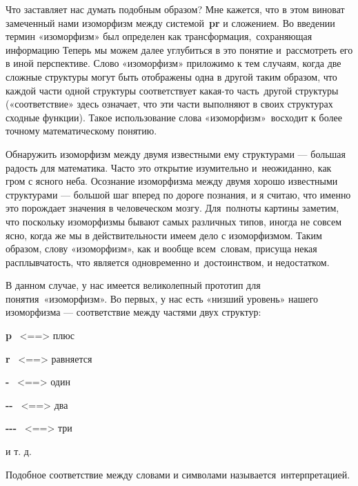 Что заставляет нас думать подобным образом? Мне кажется, что в этом виноват замеченный нами изоморфизм между системой~\textbf{pr} и сложением. Во введении термин «изоморфизм» был определен как трансформация,~сохраняющая информацию Теперь мы можем далее углубиться в это понятие и~рассмотреть его в иной перспективе. Слово «изоморфизм» приложимо к тем случаям, когда две сложные структуры могут быть отображены одна в другой таким образом, что каждой части одной структуры соответствует какая-то часть~другой структуры («соответствие» здесь означает, что эти части выполняют в своих структурах сходные функции). Такое использование слова «изоморфизм»~восходит к более точному математическому понятию.

Обнаружить изоморфизм между двумя известными ему структурами --- большая радость для математика. Часто это открытие изумительно и~неожиданно, как гром с ясного неба. Осознание изоморфизма между двумя хорошо известными структурами --- большой шаг вперед по дороге познания, и я считаю, что именно это порождает значения в человеческом мозгу. Для~полноты картины заметим, что поскольку изоморфизмы бывают самых различных типов, иногда не совсем ясно, когда же мы в действительности имеем дело с изоморфизмом. Таким образом, слову «изоморфизм», как и вообще всем~словам, присуща некая расплывчатость, что является одновременно и~достоинством, и недостатком.

В данном случае, у нас имеется великолепный прототип для понятия~«изоморфизм». Во первых, у нас есть «низший уровень» нашего изоморфизма --- соответствие между частями двух структур:

\textbf{p} ~\textless==\textgreater{} плюс

\textbf{r} ~\textless==\textgreater{} равняется

\textbf{-} ~\textless==\textgreater{} один

\textbf{-\/-} ~\textless==\textgreater{} два

\textbf{-\/-\/-} ~\textless==\textgreater{} три

и т. д.

Подобное соответствие между словами и символами называется~интерпретацией.

